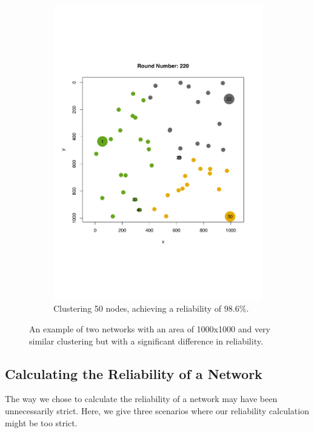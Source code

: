 \begin{figure}[bt]
\begin{subfigure}{0.49\textwidth}
        \includegraphics[width=\textwidth, keepaspectratio]{figure/Results/Discussion/ClusteringExample50nodes1000x1000maxOffRun5Good.pdf}
        \caption{Clustering 50 nodes, achieving a reliability of $98.6\%$.}
        \label{subfig:good-clustering}
    \end{subfigure}
    \caption{An example of two networks with an area of 1000x1000 and very similar clustering but with a significant difference in reliability.}
    \label{fig:comparing-good-and-bad-clustering}
\end{figure}

\subsection{Calculating the Reliability of a Network}
The way we chose to calculate the reliability of a network may have been unnecessarily strict. Here, we give three scenarios where our reliability calculation might be too strict.

